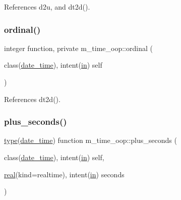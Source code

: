 References d2u, and dt2d().

\mbox{\label{namespacem__time__oop_a7845f6da505dff53007df45b5c198081}} 
\subsubsection{\texorpdfstring{ordinal()}{ordinal()}}
{\footnotesize\ttfamily integer function, private m\+\_\+time\+\_\+oop\+::ordinal (\begin{DoxyParamCaption}\item[{class(\hyperlink{structm__time__oop_1_1date__time}{date\+\_\+time}), intent(\hyperlink{M__journal_83_8txt_afce72651d1eed785a2132bee863b2f38}{in})}]{self }\end{DoxyParamCaption})\hspace{0.3cm}{\ttfamily [private]}}



References dt2d().

\mbox{\label{namespacem__time__oop_a6830c1cce303ec401ac8e4333a5a73d4}} 
\subsubsection{\texorpdfstring{plus\+\_\+seconds()}{plus\_seconds()}}
{\footnotesize\ttfamily \hyperlink{stop__watch_83_8txt_a70f0ead91c32e25323c03265aa302c1c}{type}(\hyperlink{structm__time__oop_1_1date__time}{date\+\_\+time}) function m\+\_\+time\+\_\+oop\+::plus\+\_\+seconds (\begin{DoxyParamCaption}\item[{class(\hyperlink{structm__time__oop_1_1date__time}{date\+\_\+time}), intent(\hyperlink{M__journal_83_8txt_afce72651d1eed785a2132bee863b2f38}{in})}]{self,  }\item[{\hyperlink{read__watch_83_8txt_abdb62bde002f38ef75f810d3a905a823}{real}(kind=realtime), intent(\hyperlink{M__journal_83_8txt_afce72651d1eed785a2132bee863b2f38}{in})}]{seconds }\end{DoxyParamCaption})\hspace{0.3cm}{\ttfamily [private]}}



